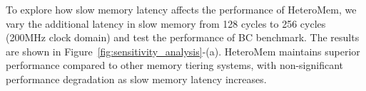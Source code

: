 To explore how slow memory latency affects the performance of HeteroMem, we vary the additional latency in slow memory from 128 cycles to 256 cycles (200MHz clock domain) and test the performance of BC benchmark. The results are shown in Figure~\ref{fig:sensitivity_analysis}-(a). HeteroMem maintains superior performance compared to other memory tiering systems, with non-significant performance degradation as slow memory latency increases. 
